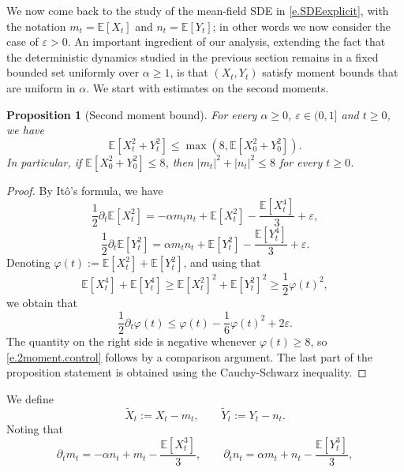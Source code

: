\documentclass[11pt]{amsart}
\newtheorem{proposition}{Proposition}
\theoremstyle{remark}
\theoremstyle{definition}
\numberwithin{equation}{section}
\numberwithin{proposition}{section}
\newcommand{\ep}{\varepsilon}
\renewcommand{\le}{\leqslant}
\renewcommand{\ge}{\geqslant}
\newcommand{\td}{\widetilde}
\newcommand{\Ll}{\left}
\newcommand{\Rr}{\right}
\newcommand{\dr}{\partial}
\newcommand{\1}{\mathbf{1}}
\newcommand{\al}{\alpha}
\newcommand{\E}{\mathbb E}
\renewcommand{\phi}{\varphi}
\begin{document}
We now come back to the study of the mean-field SDE in \eqref{e.SDEexplicit}, with the notation $m_t = \E[X_t]$ and $n_t = \E[Y_t]$; in other words we now consider the case of $\ep > 0$. An important ingredient of our analysis, extending the fact that the deterministic dynamics studied in the previous section remains in a fixed bounded set uniformly over $\al \ge 1$, is that $(X_t, Y_t)$ satisfy moment bounds that are uniform in $\al$. We start with estimates on the second moments.
\begin{proposition}[Second moment bound]
\label{p.2moment.control}
For every $\alpha \ge 0$, $\ep \in (0,1]$ and $t \ge 0$, we have
\begin{equation}  
\label{e.2moment.control}
\E[X_t^2 + Y_t^2] \le \max \Ll( 8, \E[X_0^2 + Y_0^2] \Rr) .
\end{equation}
In particular, if $\E[X_0^2 + Y_0^2] \le 8$, then $|m_t|^2 + |n_t|^2 \le 8$ for every $t \ge 0$.
\end{proposition}
\begin{proof}
By It\^o's formula, we have
\begin{equation*}  %
\frac 1 2 \dr_t \E[X_t^2] = -\alpha m_t n_t + \E[X_t^2] - \frac {\E[X_t^4]}{3} + \ep,
\end{equation*}
\begin{equation*}  %
\frac 1 2 \dr_t \E[Y_t^2] = \alpha m_t n_t + \E[Y_t^2] - \frac {\E[Y_t^4]}{3} + \ep.
\end{equation*}
Denoting $\phi(t) := \E[X_t^2] + \E[Y_t^2]$, and using that
\begin{equation*}  %
\E[X_t^4] + \E[Y_t^4] \ge \E[X_t^2]^2 + \E[Y_t^2]^2 \ge \frac 1 2 \phi(t)^2,
\end{equation*}
we obtain that 
\begin{equation*}  %
\frac 1 2 \dr_t \phi(t) \le \phi(t) - \frac 1 6 \phi(t)^2 + 2\ep.
\end{equation*}
The quantity on the right side is negative whenever $\phi(t) \ge 8$, so \eqref{e.2moment.control} follows by a comparison argument. The last part of the proposition statement is obtained using the Cauchy-Schwarz inequality.
\end{proof}
We define
\begin{equation}
\label{e.def.tdX.tdY}
\td X_t := X_t - m_t, \qquad \td Y_t := Y_t - n_t.
\end{equation}
Noting that 
\begin{equation}  
\label{e.ev.mn}
\dr_t m_t = -\alpha n_t + m_t - \frac{\E[X_t^3]}{3}, \qquad \dr_t n_t = \alpha m_t + n_t - \frac{\E[Y_t^3]}{3},
\end{equation}
\end{document}
